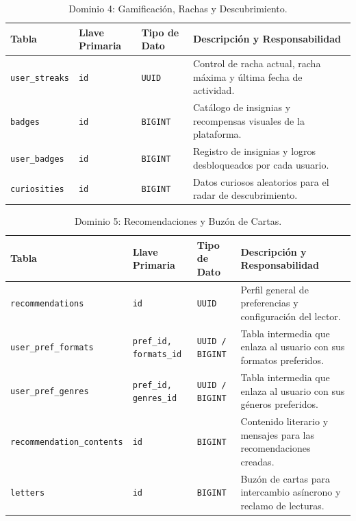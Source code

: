 \documentclass[12pt, atypical, journal]{article}
\begin{document}
\begin{table}[H]
\centering
\footnotesize
\begin{tabular}{|p{3.5cm}|p{2.3cm}|p{2cm}|p{5.5cm}|}
\hline
\textbf{Tabla} & \textbf{Llave Primaria} & \textbf{Tipo de Dato} & \textbf{Descripción y Responsabilidad} \\ \hline
\texttt{user\_streaks} & \texttt{id} & \texttt{UUID} & Control de racha actual, racha máxima y última fecha de actividad. \\ \hline
\texttt{badges} & \texttt{id} & \texttt{BIGINT} & Catálogo de insignias y recompensas visuales de la plataforma. \\ \hline
\texttt{user\_badges} & \texttt{id} & \texttt{BIGINT} & Registro de insignias y logros desbloqueados por cada usuario. \\ \hline
\texttt{curiosities} & \texttt{id} & \texttt{BIGINT} & Datos curiosos aleatorios para el radar de descubrimiento. \\ \hline
\end{tabular}
\caption{Dominio 4: Gamificación, Rachas y Descubrimiento.}
\label{tab:db_gamification}
\end{table}

\begin{table}[H]
\centering
\footnotesize
\begin{tabular}{|p{3.7cm}|p{2.1cm}|p{2cm}|p{5.5cm}|}
\hline
\textbf{Tabla} & \textbf{Llave Primaria} & \textbf{Tipo de Dato} & \textbf{Descripción y Responsabilidad} \\ \hline
\texttt{recommendations} & \texttt{id} & \texttt{UUID} & Perfil general de preferencias y configuración del lector. \\ \hline
\texttt{user\_pref\_formats} & \texttt{pref\_id, formats\_id} & \texttt{UUID / BIGINT} & Tabla intermedia que enlaza al usuario con sus formatos preferidos. \\ \hline
\texttt{user\_pref\_genres} & \texttt{pref\_id, genres\_id} & \texttt{UUID / BIGINT} & Tabla intermedia que enlaza al usuario con sus géneros preferidos. \\ \hline
\texttt{recommendation\_contents} & \texttt{id} & \texttt{BIGINT} & Contenido literario y mensajes para las recomendaciones creadas. \\ \hline
\texttt{letters} & \texttt{id} & \texttt{BIGINT} & Buzón de cartas para intercambio asíncrono y reclamo de lecturas. \\ \hline
\end{tabular}
\caption{Dominio 5: Recomendaciones y Buzón de Cartas.}
\label{tab:db_social}
\end{table}
\end{document}
